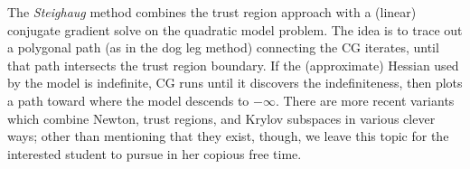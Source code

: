 \documentclass[12pt, leqno]{article} %
\begin{document}
The {\em Steighaug} method combines the trust region approach with
a (linear) conjugate gradient solve on the quadratic model problem.
The idea is to trace out a polygonal path (as in the dog leg method)
connecting the CG iterates, until that path intersects the trust
region boundary.  If the (approximate) Hessian used by the model is
indefinite, CG runs until it discovers the indefiniteness, then
plots a path toward where the model descends to $-\infty$.  There are
more recent variants which combine Newton, trust regions, and Krylov
subspaces in various clever ways; other than mentioning that they
exist, though, we leave this topic for the interested student to
pursue in her copious free time.
\end{document}
